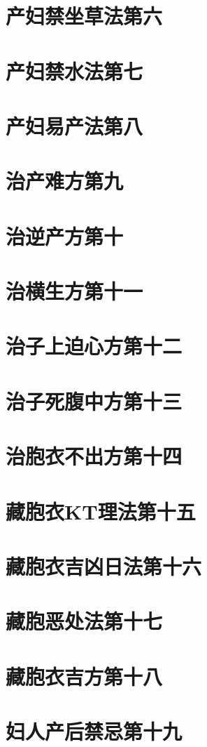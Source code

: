 \documentclass[a4paper,12pt,UTF8,twoside]{ctexbook}
\begin{document}
\chapter{产妇禁坐草法第六}
\chapter{产妇禁水法第七}
\chapter{产妇易产法第八}
\chapter{治产难方第九}
\chapter{治逆产方第十}
\chapter{治横生方第十一}
\chapter{治子上迫心方第十二}
\chapter{治子死腹中方第十三}
\chapter{治胞衣不出方第十四}
\chapter{藏胞衣KT理法第十五}
\chapter{藏胞衣吉凶日法第十六}
\chapter{藏胞恶处法第十七}
\chapter{藏胞衣吉方第十八}
\chapter{妇人产后禁忌第十九}
\end{document}
